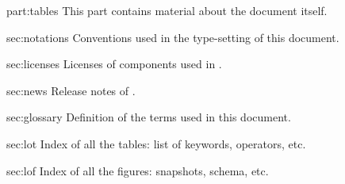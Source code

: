 
\begin{partDescription}{part:tables}
  {
    This part contains material about the document itself.
  }
\item[sec:notations]%
  Conventions used in the type-setting of this document.

\item[sec:licenses]%
  Licenses of components used in \usdk.

\item[sec:news]%
  Release notes of \usdk.

\item[sec:glossary]%
  Definition of the terms used in this document.

\item[sec:lot]%
  Index of all the tables: list of keywords, operators, etc.

\item[sec:lof]%
  Index of all the figures: snapshots, schema, etc.

\end{partDescription}


